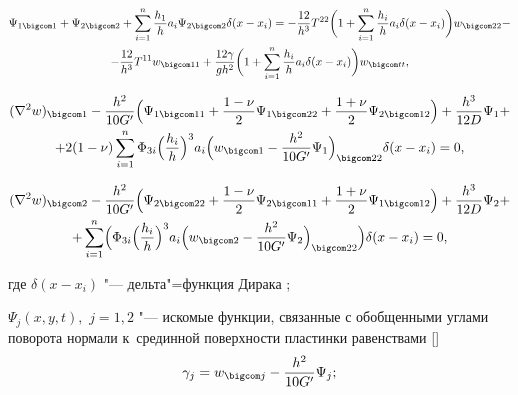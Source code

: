 \begin{multline}

    \Psi_{1\bigcom 1}+\Psi_{2\bigcom 2}+\sum_{i=1}^n \frac{h_1}{h} a_i \Psi_{2\bigcom 2} \delta(x-x_i)=

-\frac{12}{h^3} T^{22}\biggl(

    1+\sum_{i=1}^n \frac{h_i}{h} a_i \delta(x-x_i)\biggr)w_{\bigcom 22} -

    \\ -\frac{12}{h^3} T^{11}w_{\bigcom 11}    +\frac{12 \gamma}{g h^2}\biggl(1+\sum_{i=1}^n \frac{h_i}{h} a_i\delta(x-x_i)\biggr)w_{\bigcom tt},

\end{multline}

\begin{multline}

\label{eq:myl:f02}

(\nabla^2 w)_{\bigcom 1}-\frac{h^2}{10 G'}

\Bigl(\Psi_{1 \bigcom 11}+\frac{1-\nu}{2} \Psi_{1 \bigcom 22}+\frac{1+\nu}{2}\Psi_{2 \bigcom 12}\Bigr)+

\frac{h^3}{12 D}\Psi_1+ \\

 +2({1-\nu})\sum_{i=1}^n \Phi_{3i}

 \Bigl(\frac{h_i}{h}\Bigr)^3 a_i \Bigl(w_{\bigcom 1}-\frac{h^2}{10 G'}\Psi_1\Bigr)_{\bigcom 22}\delta(x-x_i)=0,

\end{multline}

\begin{multline}

(\nabla^2 w)_{\bigcom 2}-\frac{h^2}{10 G'}

\Bigl(\Psi_{2 \bigcom 22}+\frac{1-\nu}{2} \Psi_{2 \bigcom 11}+\frac{1+\nu}{2}\Psi_{1\bigcom 12}\Bigr)+

\frac{h^3}{12 D}\Psi_2+

\\

+\sum_{i=1}^n \Bigl(\Phi_{3i}\Bigl(\frac{h_i}{h}\Bigr)^3 a_i \Bigl(w_{\bigcom 2}-\frac{h^2}{10 G'}\Psi_2\Bigr)_{\bigcom 22}  \Bigr)\delta(x-x_i)=0,

\end{multline}

где $\delta(x-x_i)$ "--- дельта"=функция Дирака \cite{mylpolbel:bib:Mikucincki};   

$\Psi_j(x,y,t),$ $j=1, 2$ "--- искомые функции, связанные с обобщенными углами поворота нормали к~срединной поверхности пластинки  равенствами [] $$\gamma_j=w_{\bigcom j}-\frac{h^2}{10 G'}\Psi_j;$$ 

